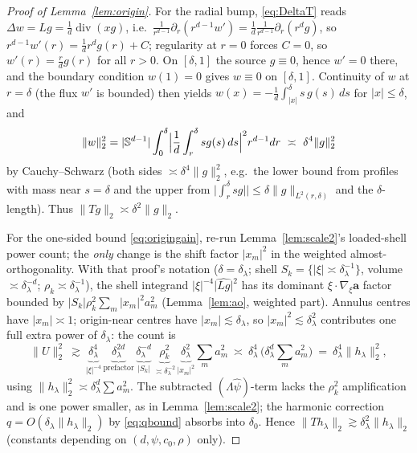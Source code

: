 \documentclass[11pt]{article}
\theoremstyle{remark}
\newcommand{\norm}[1]{\lVert #1\rVert}
\newcommand{\abs}[1]{\lvert #1\rvert}
\newcommand{\SET}[1]{\{#1\}}
\DeclareMathOperator{\diver}{div}
\begin{document}
\begin{proof}[Proof of Lemma~\ref{lem:origin}]
For the radial bump, \eqref{eq:DeltaT} reads $\Delta w=Lg=\frac1d
\diver(xg)$, i.e.\
$\frac1{r^{d-1}}\partial_r(r^{d-1}w')=\frac1d\frac1{r^{d-1}}
\partial_r(r^{d}g)$, so $r^{d-1}w'(r)=\frac1d r^{d}g(r)+C$; regularity at
$r=0$ forces $C=0$, so $w'(r)=\frac{r}{d}g(r)$ for all $r>0$. On
$[\delta,1]$ the source $g\equiv0$, hence $w'=0$ there, and the boundary
condition $w(1)=0$ gives $w\equiv0$ on $[\delta,1]$. Continuity of $w$
at $r=\delta$ (the flux $w'$ is bounded) then yields
$w(x)=-\frac1d\int_{\abs x}^{\delta}s\,g(s)\,ds$ for $\abs x\le\delta$, and
\[
\norm{w}_2^{2}
=\abs{\mathbb S^{d-1}}\int_0^{\delta}
\Bigl|\frac1d\int_r^{\delta}sg(s)\,ds\Bigr|^{2}r^{d-1}dr
\ \asymp\ \delta^{4}\norm{g}_2^{2}
\]
by Cauchy--Schwarz (both sides $\asymp\delta^{4}\norm{g}_2^{2}$, e.g.\ the
lower bound from profiles with mass near $s=\delta$ and the upper from
$\abs{\int_r^\delta sg}| \le\delta\norm{g}_{L^2(r,\delta)}$ and the
$\delta$-length). Thus $\norm{Tg}_2\asymp\delta^{2}\norm{g}_2$.

For the one-sided bound \eqref{eq:origingain}, re-run Lemma~\ref{lem:scale2}'s
loaded-shell power count; the \emph{only} change is the shift factor
$\abs{x_m}^{2}$ in the weighted almost-orthogonality. With that proof's
notation ($\delta=\delta_\lambda$; shell
$S_k=\SET{\abs\xi\asymp\delta_\lambda^{-1}}$, volume $\asymp\delta_\lambda^{-d}$;
$\rho_k\asymp\delta_\lambda^{-1}$), the shell integrand
$\abs\xi^{-4}\abs{\widehat{Lg}}^{2}$ has its dominant
$\xi\cdot\nabla_\xi\mathbf a$ factor bounded by
$\abs{S_k}\rho_k^{2}\sum_m\abs{x_m}^{2}a_m^{2}$ (Lemma~\ref{lem:ao},
weighted part). Annulus centres have $\abs{x_m}\asymp1$; origin-near
centres have $\abs{x_m}\lesssim\delta_\lambda$, so $\abs{x_m}^{2}
\lesssim\delta_\lambda^{2}$ contributes one full extra power of
$\delta_\lambda$: the count is
\[
\norm{U}_2^{2}
\ \gtrsim\ \underbrace{\delta_\lambda^{4}}_{\abs\xi^{-4}}\,
\underbrace{\delta_\lambda^{2d}}_{\text{prefactor}}\,
\underbrace{\delta_\lambda^{-d}}_{\abs{S_k}}\,
\underbrace{\rho_k^{2}}_{\asymp\delta_\lambda^{-2}}\,
\underbrace{\delta_\lambda^{2}}_{\abs{x_m}^{2}}\sum_m a_m^{2}
\ \asymp\ \delta_\lambda^{4}\,\bigl(\delta_\lambda^{d}\sum_m a_m^{2}\bigr)
\ =\ \delta_\lambda^{4}\norm{h_\lambda}_2^{2},
\]
using $\norm{h_\lambda}_2^2\asymp\delta_\lambda^{d}\sum a_m^{2}$. The
subtracted $(\Lambda\widehat\psi)$-term lacks the $\rho_k^{2}$
amplification and is one power smaller, as in Lemma~\ref{lem:scale2}; the
harmonic correction $q=O(\delta_\lambda\norm{h_\lambda}_2)$ by
\eqref{eq:qbound} absorbs into $\delta_0$. Hence
$\norm{Th_\lambda}_2\gtrsim\delta_\lambda^{2}\norm{h_\lambda}_2$
(constants depending on $(d,\psi,c_0,\rho)$ only).
\end{proof}
\end{document}
